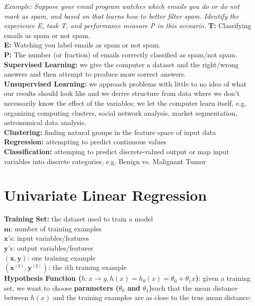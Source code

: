 \documentclass{article}
\begin{document}
        \noindent \textit{Example: Suppose your email program watches which emails you do or do not mark as spam, and based on
        that learns how to better filter spam. Identify the experience E, task T, and performance measure P
        in this scenario.}
        \noindent \textbf{T:} Classifying emails as spam or not spam. \\
        \noindent \textbf{E:} Watching you label emails as spam or not spam. \\
        \noindent \textbf{P:} The number (or fraction) of emails correctly classified as spam/not spam. \\

        \noindent \textbf{Supervised Learning:} we give the computer a dataset and the right/wrong answers
        and then attempt to produce more correct answers. \\
        \noindent \textbf{Unsupervised Learning:} we approach problems with little to no idea of what our
        results should look like and we derive structure from data where we don't necessarily know the effect
        of the variables; we let the computer learn itself, e.g. organizing computing clusters, social network
        analysis, market segmentation, astronomical data analysis. \\
        
        \noindent \textbf{Clustering:} finding natural groups in the feature space of input data \\
        \noindent \textbf{Regression:} attempting to predict continuous values \\
        \noindent \textbf{Classification:} attemping to predict discrete-valued output or map input variables
        into discrete categories, e.g. Benign vs. Malignant Tumor \\



    \pagebreak
    \section{Univariate Linear Regression}
        \noindent \textbf{Training Set:} the dataset used to train a model \\
        $\bm{m}$: number of training examples \\
        $\bm{x}$'s: input variables/features \\
        $\bm{y}$'s: output variables/features \\
        $\bm{(x,y)}$: one training example \\
        $\bm{(x^{(i)}, y^{(i)})}$: the $i$th training example \\
        \textbf{Hypothesis Function ($h:x\to y,h(x)=h_\theta (x)=\theta_0+\theta_1 x$)}: given a training set,
        we want to choose \textbf{parameters ($\theta_0$ and $\theta_1$)}such that the mean distance between
        $h(x)$ and the training examples are as close to the true mean distance:
\end{document}
